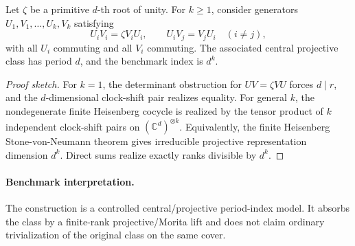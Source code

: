 \begin{theorem}
Let $\zeta$ be a primitive $d$-th root of unity.  For $k \ge 1$, consider
generators $U_1,V_1,\ldots,U_k,V_k$ satisfying
\[
  U_i V_i = \zeta V_i U_i,\qquad
  U_i V_j = V_j U_i\quad (i \ne j),
\]
with all $U_i$ commuting and all $V_i$ commuting.  The associated central
projective class has period $d$, and the benchmark index is $d^k$.
\end{theorem}

\begin{proof}[Proof sketch]
For $k=1$, the determinant obstruction for $U V = \zeta V U$ forces
$d \mid r$, and the $d$-dimensional clock-shift pair realizes equality.  For
general $k$, the nondegenerate finite Heisenberg cocycle is realized by the
tensor product of $k$ independent clock-shift pairs on
$(\mathbb{C}^d)^{\otimes k}$.  Equivalently, the finite Heisenberg
Stone-von-Neumann theorem gives irreducible projective representation
dimension $d^k$.  Direct sums realize exactly ranks divisible by $d^k$.
\end{proof}

\paragraph{Benchmark interpretation.}
The construction is a controlled central/projective period-index model.  It
absorbs the class by a finite-rank projective/Morita lift and does not claim
ordinary trivialization of the original class on the same cover.

